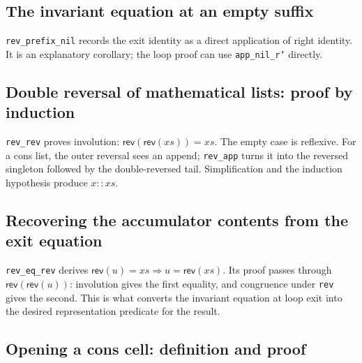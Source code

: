 \documentclass[11pt]{article}
\begin{document}
\subsection{The invariant equation at an empty suffix}

\begin{minipage}{\linewidth}

\end{minipage}

\texttt{rev\_prefix\_nil} records the exit identity as a direct application of
right identity. It is an explanatory corollary; the loop proof can use
\texttt{app\_nil\_r'} directly.

\subsection{Double reversal of mathematical lists: proof by induction}

\begin{minipage}{\linewidth}

\end{minipage}

\texttt{rev\_rev} proves involution:
\(\mathsf{rev}(\mathsf{rev}(xs))=xs\). The empty case is reflexive.
For a cons list, the outer reversal sees an append; \texttt{rev\_app} turns it
into the reversed singleton followed by the double-reversed tail. Simplification
and the induction hypothesis produce \(x::xs\).

\subsection{Recovering the accumulator contents from the exit equation}

\begin{minipage}{\linewidth}

\end{minipage}

\texttt{rev\_eq\_rev} derives
\(\mathsf{rev}(u)=xs\Rightarrow u=\mathsf{rev}(xs)\).
Its proof passes through \(\mathsf{rev}(\mathsf{rev}(u))\): involution gives the
first equality, and congruence under \texttt{rev} gives the second. This is what
converts the invariant equation at loop exit into the desired representation
predicate for the result.

\subsection{Opening a cons cell: definition and proof}
\end{document}
